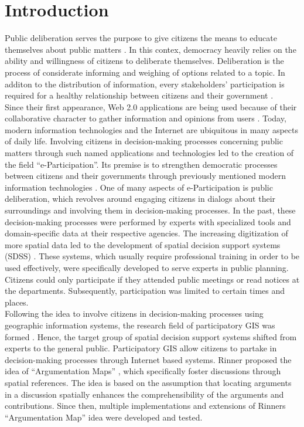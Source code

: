 \section{Introduction}
\label{chap:introduction}
Public deliberation serves the purpose to give citizens the means to educate themselves about public matters \cite{page1996deliberates}. In this contex, democracy heavily relies on the ability and willingness of citizens to deliberate themselves. Deliberation is the process of considerate informing and weighing of options related to a topic. In additon to the distribution of information, every stakeholders' participation is required for a healthy relationship between citizens and their government \cite{Arnstein1969_citizen_participation}.\\
Since their first appearance, Web 2.0 applications are being used because of their collaborative character to gather information and opinions from users \cite{o2007web}. Today, modern information technologies and the Internet are ubiquitous in many aspects of daily life. Involving citizens in decision-making processes concerning public matters through such named applications and technologies led to the creation of the field ``e-Participation''. Its premise is to strengthen democratic processes between citizens and their governments through previously mentioned modern information technologies \cite{Saebo_eParticipation, Medaglia2012_eParticipation}. One of many aspects of e-Participation is public deliberation, which revolves around engaging citizens in dialogs about their surroundings and involving them in decision-making processes. In the past, these decision-making processes were performed by experts with specialized tools and domain-specific data at their respective agencies. The increasing digitization of more spatial data led to the development of spatial decision support systems (SDSS) \cite{densham_sdss}. These systems, which usually require professional training in order to be used effectively, were specifically developed to serve experts in public planning. Citizens could only participate if they attended public meetings or read notices at the departments. Subsequently, participation was limited to certain times and places.\\
Following the idea to involve citizens in decision-making processes using geographic information systems, the research field of participatory GIS was formed \cite{Macintosh2004_eParticipation_characterization,Sieber2006_PublicParticipationGIS}. Hence, the target group of spatial decision support systems shifted from experts to the general public. Participatory GIS allow citizens to partake in decision-making processes through Internet based systems. Rinner proposed the idea of ``Argumentation Maps'' \cite{Rinner_ArgumentationMaps}, which specifically foster discussions through spatial references. The idea is based on the assumption that locating arguments in a discussion spatially enhances the comprehensibility of the arguments and contributions. Since then, multiple implementations and extensions of Rinners ``Argumentation Map'' idea were developed and tested.\\
